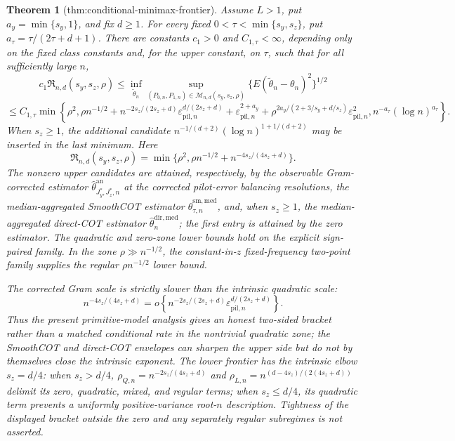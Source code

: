 \documentclass{article}
\newtheorem{theorem}{Theorem}
\begin{document}
\begin{theorem}[thm:conditional-minimax-frontier]\label{thm:conditional-minimax-frontier}
Assume \(L>1\), put \(a_y=\min\{s_y,1\}\), and fix \(d\ge1\). For every fixed \(0<\tau<\min\{s_y,s_z\}\), put \(a_\tau=\tau/(2\tau+d+1)\). There are constants \(c_1>0\) and \(C_{1,\tau}<\infty\), depending only on the fixed class constants and, for the upper constant, on \(\tau\), such that for all sufficiently large \(n\),
\[
c_1\mathfrak R_{n,d}(s_y,s_z,\rho)\le\inf_{\widetilde\theta_n}\sup_{(P_{0,n},P_{1,n})\in\mathcal M_{n,d}(s_y,s_z,\rho)}\{E(\widetilde\theta_n-\theta_n)^2\}^{1/2}
\]
\[
\le C_{1,\tau}\min\!\left\{
\rho^2,
\rho n^{-1/2}
+n^{-2s_z/(2s_z+d)}\varepsilon_{\mathrm{pil},n}^{d/(2s_z+d)}
+\varepsilon_{\mathrm{pil},n}^{2+a_y}
+\rho^{2a_y/(2+3/s_y+d/s_z)}\varepsilon_{\mathrm{pil},n}^2,
n^{-a_\tau}(\log n)^{a_\tau}
\right\}.
\]
When \(s_z\ge1\), the additional candidate \(n^{-1/(d+2)}(\log n)^{1+1/(d+2)}\) may be inserted in the last minimum. Here
\[
\mathfrak R_{n,d}(s_y,s_z,\rho)=\min\{\rho^2,\rho n^{-1/2}+n^{-4s_z/(4s_z+d)}\}.
\]
The nonzero upper candidates are attained, respectively, by the observable Gram-corrected estimator \(\widehat\theta^{\mathrm{an}}_{J_y^*,J_z^*,n}\) at the corrected pilot-error balancing resolutions, the median-aggregated SmoothCOT estimator \(\widehat\theta^{\mathrm{sm,med}}_{\tau,n}\), and, when \(s_z\ge1\), the median-aggregated direct-COT estimator \(\widehat\theta_n^{\mathrm{dir,med}}\); the first entry is attained by the zero estimator. The quadratic and zero-zone lower bounds hold on the explicit sign-paired family. In the zone \(\rho\gg n^{-1/2}\), the constant-in-\(z\) fixed-frequency two-point family supplies the regular \(\rho n^{-1/2}\) lower bound.

The corrected Gram scale is strictly slower than the intrinsic quadratic scale:
\[
n^{-4s_z/(4s_z+d)}
=o\!\left\{n^{-2s_z/(2s_z+d)}
\varepsilon_{\mathrm{pil},n}^{d/(2s_z+d)}\right\}.
\]
Thus the present primitive-model analysis gives an honest two-sided bracket rather than a matched conditional rate in the nontrivial quadratic zone; the SmoothCOT and direct-COT envelopes can sharpen the upper side but do not by themselves close the intrinsic exponent.  The lower frontier has the intrinsic elbow \(s_z=d/4\): when \(s_z>d/4\), \(\rho_{Q,n}=n^{-2s_z/(4s_z+d)}\) and \(\rho_{L,n}=n^{(d-4s_z)/(2(4s_z+d))}\) delimit its zero, quadratic, mixed, and regular terms; when \(s_z\le d/4\), its quadratic term prevents a uniformly positive-variance root-\(n\) description. Tightness of the displayed bracket outside the zero and any separately regular subregimes is not asserted.
\end{theorem}
\end{document}
